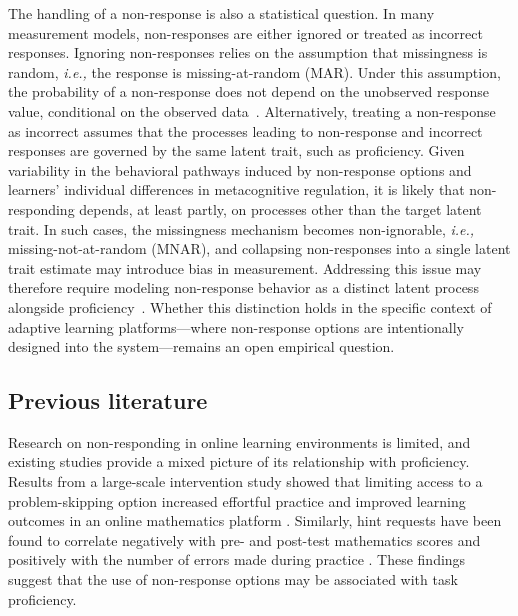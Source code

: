 \documentclass[12pt]{article}
\begin{document}
The handling of a non-response is also a statistical question. In many measurement models, non-responses are either ignored or treated as incorrect responses. Ignoring non-responses relies on the assumption that missingness is random, \textit{i.e.,} the response is missing-at-random (MAR). Under this assumption, the probability of a non-response does not depend on the unobserved response value, conditional on the observed data~\parencite{rubin1976inference}. Alternatively, treating a non-response as incorrect assumes that the processes leading to non-response and incorrect responses are governed by the same latent trait, such as proficiency. Given variability in the behavioral pathways induced by non-response options and learners’ individual differences in metacognitive regulation, it is likely that non-responding depends, at least partly, on processes other than the target latent trait. In such cases, the missingness mechanism becomes non-ignorable, \textit{i.e.,} missing-not-at-random (MNAR), and collapsing non-responses into a single latent trait estimate may introduce bias in measurement. Addressing this issue may therefore require modeling non-response behavior as a distinct latent process alongside proficiency~\parencite{little2019statistical}. Whether this distinction holds in the specific context of adaptive learning platforms---where non-response options are intentionally designed into the system---remains an open empirical question.


\subsection{Previous literature}
Research on non-responding in online learning environments is limited, and existing studies provide a mixed picture of its relationship with proficiency. Results from a large-scale intervention study showed that limiting access to a problem-skipping option increased effortful practice and improved learning outcomes in an online mathematics platform \parencite{savi2018delaying, savi2023combating}. Similarly, hint requests have been found to correlate negatively with pre- and post-test mathematics scores and positively with the number of errors made during practice \parencite{norum2024student}. These findings suggest that the use of non-response options may be associated with task proficiency. 
\end{document}
